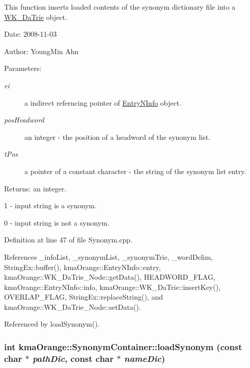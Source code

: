 This function inserts loaded contents of the synonym dictionary file into a \hyperlink{classkmaOrange_1_1WK__DaTrie}{WK\_\-DaTrie} object. 

\begin{Desc}
\item[Date:]2008-11-03 \end{Desc}
\begin{Desc}
\item[Author:]YoungMin Ahn \end{Desc}
\begin{Desc}
\item[Parameters:]
\begin{description}
\item[{\em ei}]a indirect referncing pointer of \hyperlink{classkmaOrange_1_1EntryNInfo}{EntryNInfo} object. \item[{\em posHeadword}]an integer - the position of a headword of the synonym list. \item[{\em tPos}]a pointer of a constant character - the string of the synonym list entry. \end{description}
\end{Desc}
\begin{Desc}
\item[Returns:]an integer.\par
 1 - input string is a synonym.\par
 0 - input string is not a synonym. \end{Desc}


Definition at line 47 of file Synonym.cpp.

References \_\-infoList, \_\-synonymList, \_\-synonymTrie, \_\-wordDelim, StringEx::buffer(), kmaOrange::EntryNInfo::entry, kmaOrange::WK\_\-DaTrie\_\-Node::getData(), HEADWORD\_\-FLAG, kmaOrange::EntryNInfo::info, kmaOrange::WK\_\-DaTrie::insertKey(), OVERLAP\_\-FLAG, StringEx::replaceString(), and kmaOrange::WK\_\-DaTrie\_\-Node::setData().

Referenced by loadSynonym().\hypertarget{classkmaOrange_1_1SynonymContainer_8459ec6b5a2d9c1b5313db22be6b65e4}{
\subsubsection[{loadSynonym}]{\setlength{\rightskip}{0pt plus 5cm}int kmaOrange::SynonymContainer::loadSynonym (const char $\ast$ {\em pathDic}, \/  const char $\ast$ {\em nameDic})}}
\label{classkmaOrange_1_1SynonymContainer_8459ec6b5a2d9c1b5313db22be6b65e4}


